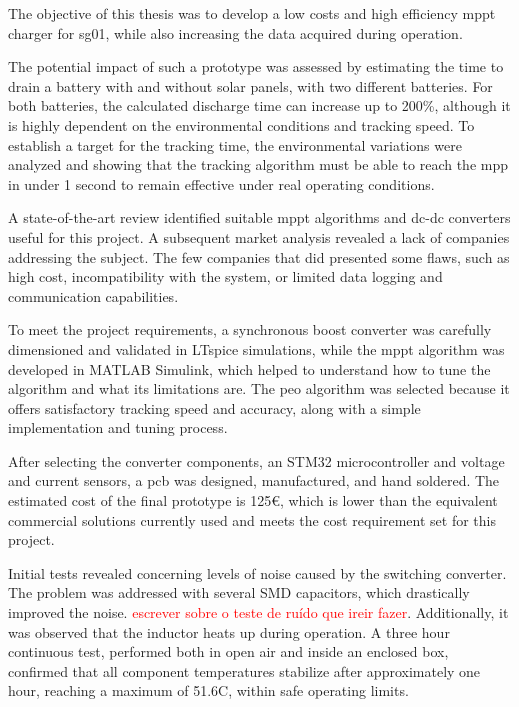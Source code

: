 \label{chap:Conclusion}

The objective of this thesis was to develop a low costs and high efficiency \ac{mppt} charger for \ac{sg01}, while also increasing the data acquired during operation. 

The potential impact of such a prototype was assessed by estimating the time to drain a battery with and without solar panels, with two different batteries. For both batteries, the calculated discharge time can increase up to 200\%, although it is highly dependent on the environmental conditions and tracking speed. To establish a target for the tracking time, the environmental variations were analyzed and showing that the tracking algorithm must be able to reach the \ac{mpp} in under 1 second to remain effective under real operating conditions.

A state-of-the-art review identified suitable \ac{mppt} algorithms and \acs{dc}-\acs{dc} converters useful for this project. A subsequent market analysis revealed a lack of companies addressing the subject. The few companies that did presented some flaws, such as high cost, incompatibility with the system, or limited data logging and communication capabilities.

To meet the project requirements, a synchronous boost converter was carefully dimensioned and validated in LTspice simulations, while the \ac{mppt} algorithm was developed in MATLAB Simulink, which helped to understand how to tune the algorithm and what its limitations are. The \ac{peo} algorithm was selected because it offers satisfactory tracking speed and accuracy, along with a simple implementation and tuning process.

After selecting the converter components, an STM32 microcontroller and voltage and current sensors, a \ac{pcb} was designed, manufactured, and hand soldered.
The estimated cost of the final prototype is 125€, which is lower than the equivalent commercial solutions currently used and meets the cost requirement set for this project.

Initial tests revealed concerning levels of noise caused by the switching converter. The problem was addressed with several SMD capacitors, which drastically improved the noise. \textcolor{red}{escrever sobre o teste de ruído que ireir fazer}. Additionally, it was observed that the inductor heats up during operation. A three hour continuous test, performed both in open air and inside an enclosed box, confirmed that all component temperatures stabilize after approximately one hour, reaching a maximum of 51.6\textdegree C, within safe operating limits.

